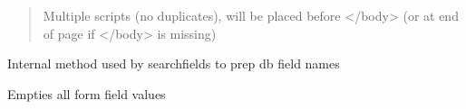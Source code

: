 \documentclass[letterpaper,10pt,english]{sphinxmanual}
\begin{document}
\begin{fulllineitems}
\begin{fulllineitems}
\begin{description}
\begin{itemize}
\begin{quote}
Multiple scripts (no duplicates), will be placed before \textless{}/body\textgreater{} (or at end of page if \textless{}/body\textgreater{} is missing)
\end{quote}

\end{itemize}

\end{description}

\end{fulllineitems}


\begin{fulllineitems}
\label{knop_form:knop_form.backtickthis}
Internal method used by searchfields to prep db field names

\end{fulllineitems}


\begin{fulllineitems}
\label{knop_form:knop_form.buttontemplate}
\end{fulllineitems}



\begin{fulllineitems}
\end{fulllineitems}


\begin{fulllineitems}
\label{knop_form:knop_form.class}
\end{fulllineitems}



\begin{fulllineitems}
\end{fulllineitems}


\begin{fulllineitems}
\label{knop_form:knop_form.clearfields}
Empties all form field values

\end{fulllineitems}


\end{fulllineitems}
\end{document}
